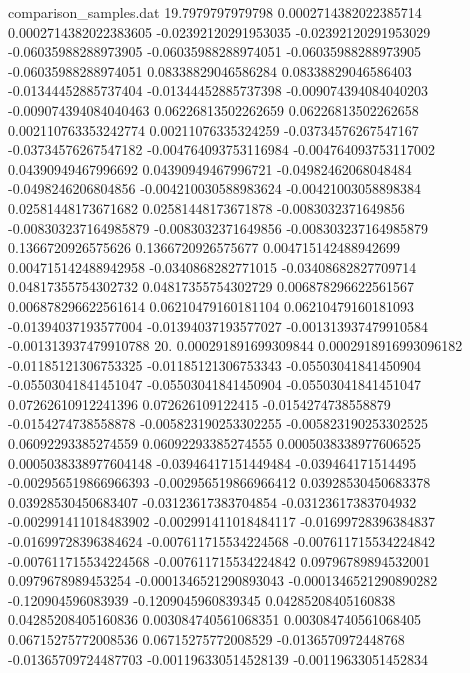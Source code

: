 \begin{filecontents}{comparison_samples.dat}
19.7979797979798    0.0002714382022385714   0.0002714382022383605   -0.02392120291953035   -0.02392120291953029   -0.06035988288973905   -0.06035988288974051   -0.06035988288973905   -0.06035988288974051   0.08338829046586284    0.08338829046586403    -0.01344452885737404    -0.01344452885737398    -0.009074394084040203  -0.009074394084040463  0.06226813502262659     0.06226813502262658     0.002110763353242774    0.00211076335324259     -0.03734576267547167    -0.03734576267547182    -0.004764093753116984   -0.004764093753117002   0.04390949467996692     0.04390949467996721     -0.04982462068048484    -0.0498246206804856     -0.004210030588983624  -0.00421003058898384   0.02581448173671682    0.02581448173671878    -0.0083032371649856     -0.008303237164985879   -0.0083032371649856     -0.008303237164985879   0.1366720926575626     0.1366720926575677     0.004715142488942699    0.004715142488942958    -0.0340868282771015    -0.03408682827709714   0.04817355754302732     0.04817355754302729     0.006878296622561567    0.006878296622561614    0.06210479160181104    0.06210479160181093    -0.01394037193577004   -0.01394037193577027   -0.001313937479910584   -0.001313937479910788 
20.                 0.000291891699309844    0.0002918916993096182   -0.01185121306753325   -0.01185121306753343   -0.05503041841450904   -0.05503041841451047   -0.05503041841450904   -0.05503041841451047   0.07262610912241396    0.072626109122415      -0.0154274738558879     -0.0154274738558878     -0.005823190253302255  -0.005823190253302525  0.06092293385274559     0.06092293385274555     0.0005038338977606525   0.0005038338977604148   -0.03946417151449484    -0.039464171514495      -0.002956519866966393   -0.002956519866966412   0.03928530450683378     0.03928530450683407     -0.03123617383704854    -0.03123617383704932    -0.002991411018483902  -0.002991411018484117  -0.01699728396384837   -0.01699728396384624   -0.007611715534224568   -0.007611715534224842   -0.007611715534224568   -0.007611715534224842   0.09796789894532001    0.0979678989453254     -0.0001346521290893043  -0.0001346521290890282  -0.120904596083939     -0.1209045960839345    0.04285208405160838     0.04285208405160836     0.003084740561068351    0.003084740561068405    0.06715275772008536    0.06715275772008529    -0.0136570972448768    -0.01365709724487703   -0.001196330514528139   -0.00119633051452834  
\end{filecontents}

